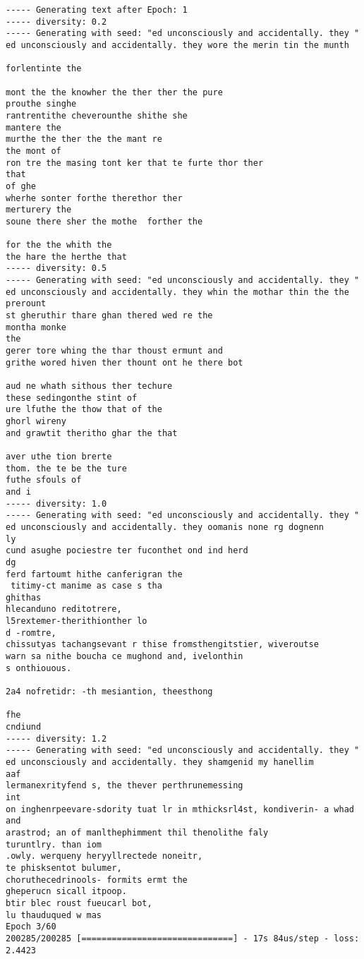 \documentclass[11pt]{article}
\begin{document}
\begin{Verbatim}[commandchars=\\\{\}]
----- Generating text after Epoch: 1
----- diversity: 0.2
----- Generating with seed: "ed unconsciously and accidentally. they "
ed unconsciously and accidentally. they wore the merin tin the munth

forlentinte the

mont the the knowher the ther ther the pure
prouthe singhe
rantrentithe cheverounthe shithe she
mantere the
murthe the ther the the mant re
the mont of
ron tre the masing tont ker that te furte thor ther
that
of ghe
wherhe sonter forthe therethor ther
merturery the
soune there sher the mothe  forther the

for the the whith the
the hare the herthe that
----- diversity: 0.5
----- Generating with seed: "ed unconsciously and accidentally. they "
ed unconsciously and accidentally. they whin the mothar thin the the prerount
st gheruthir thare ghan thered wed re the
montha monke
the
gerer tore whing the thar thoust ermunt and
grithe wored hiven ther thount ont he there bot

aud ne whath sithous ther techure
these sedingonthe stint of
ure lfuthe the thow that of the
ghorl wireny
and grawtit theritho ghar the that

aver uthe tion brerte
thom. the te be the ture
futhe sfouls of
and i
----- diversity: 1.0
----- Generating with seed: "ed unconsciously and accidentally. they "
ed unconsciously and accidentally. they oomanis none rg dognenn
ly
cund asughe pociestre ter fuconthet ond ind herd
dg
ferd fartoumt hithe canferigran the
 titimy-ct manime as case s tha
ghithas
hlecanduno reditotrere,
l5rextemer-therithionther lo
d -romtre,
chissutyas tachangsevant r thise fromsthengitstier, wiveroutse
warn sa nithe boucha ce mughond and, ivelonthin
s onthiouous.

2a4 nofretidr: -th mesiantion, theesthong

fhe
cndiund 
----- diversity: 1.2
----- Generating with seed: "ed unconsciously and accidentally. they "
ed unconsciously and accidentally. they shamgenid my hanellim
aaf
lermanexrityfend s, the thever perthrunemessing
int
on inghenrpeevare-sdority tuat lr in mthicksrl4st, kondiverin- a whad and
arastrod; an of manlthephimment thil thenolithe faly
turuntlry. than iom
.owly. werqueny heryyllrectede noneitr,
te phisksentot bulumer,
choruthecedrinools- formits ermt the
gheperucn sicall itpoop.
btir blec roust fueucarl bot,
lu thauduqued w mas
Epoch 3/60
200285/200285 [==============================] - 17s 84us/step - loss: 2.4423


\end{Verbatim}
\end{document}
